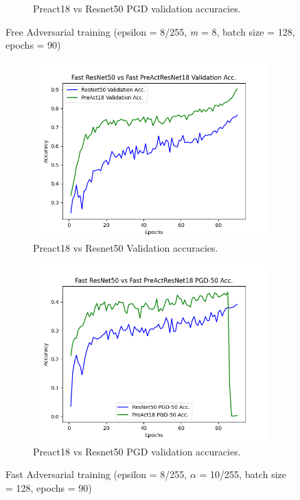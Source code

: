 \documentclass{article}
\begin{document}
\begin{figure}[hbt!]
\begin{subfigure}[b]{0.4\linewidth}
    \caption{Preact18 vs Resnet50 PGD validation accuracies.}
  \end{subfigure}
  \caption{Free Adversarial training (epsilon = 8/255, \textit{m} = 8, batch size = 128,  epochs = 90)}
  \label{fig:coffee}
\end{figure}


\begin{figure}[hbt!]
  \centering
  \begin{subfigure}[b]{0.4\linewidth}
    \includegraphics[width=\linewidth]{images/fastComp/Figure_1.png}
    \caption{ Preact18 vs Resnet50 Validation accuracies.}
  \end{subfigure}
  \begin{subfigure}[b]{0.4\linewidth}
    \includegraphics[width=\linewidth]{images/fastComp/Figure_2.png}
    \caption{Preact18 vs Resnet50 PGD validation accuracies.}
  \end{subfigure}
  \caption{Fast Adversarial training (epsilon = 8/255, $\alpha$ = 10/255, batch size = 128,  epochs = 90)}
  \label{fig:coffee}
\end{figure}
\end{document}
